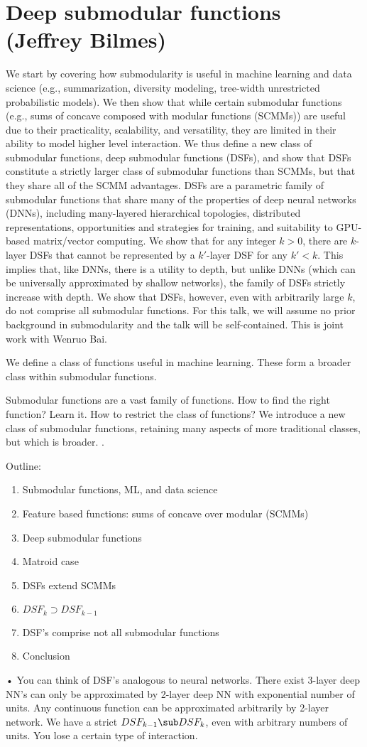 \section{Deep submodular functions (Jeffrey Bilmes)}
We start by covering how submodularity is useful in machine learning
and data science (e.g., summarization, diversity modeling, tree-width
unrestricted probabilistic models). We then show that while certain
submodular functions (e.g., sums of concave composed with modular
functions (SCMMs)) are useful due to their practicality, scalability,
and versatility, they are limited in their ability to model higher
level interaction.  We thus define a new class of submodular
functions, deep submodular functions (DSFs), and show that DSFs
constitute a strictly larger class of submodular functions than SCMMs,
but that they share all of the SCMM advantages.  DSFs are a parametric
family of submodular functions that share many of the properties of
deep neural networks (DNNs), including many-layered hierarchical
topologies, distributed representations, opportunities and strategies
for training, and suitability to GPU-based matrix/vector computing.
We show that for any integer $k>0$, there are $k$-layer DSFs that
cannot be represented by a $k'$-layer DSF for any $k'<k$. This implies
that, like DNNs, there is a utility to depth, but unlike DNNs (which
can be universally approximated by shallow networks), the family of
DSFs strictly increase with depth.  We show that DSFs, however, even
with arbitrarily large $k$, do not comprise all submodular functions.
For this talk, we will assume no prior background in submodularity and
the talk will be self-contained.  This is joint work with Wenruo Bai.

We define a class of functions useful in machine learning. These form a broader class within submodular functions.

Submodular functions are a vast family of functions. 
How to find the right function? Learn it. How to restrict the class of functions? 
We introduce a new class of submodular functions, retaining many aspects of more traditional classes, but which is broader.
.

Outline:
\begin{enumerate}
\item
Submodular functions, ML, and data science
\item
Feature based functions: sums of concave over modular (SCMMs)
\item
Deep submodular functions
\item
Matroid case
\item
DSFs extend SCMMs
\item
$DSF_k\supset DSF_{k-1}$
\item
DSF's comprise not all submodular functions
\item
Conclusion
\end{enumerate}•
You can think of DSF's analogous to neural networks. There exist 3-layer deep NN's can only be approximated by 2-layer deep NN with exponential number of units.  Any continuous function can be approximated arbitrarily by 2-layer network.
We have a strict $DSF_{k-1}\sub DSF_k$, even with arbitrary numbers of units. You lose a certain type of interaction. 

